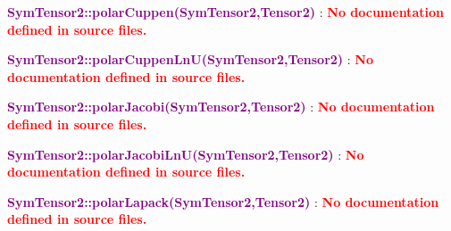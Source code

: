 
\textcolor{purple}{\textbf{SymTensor2::polarCuppen(SymTensor2,Tensor2)}}\label{SymTensor2::polarCuppen(SymTensor2,Tensor2)} : \textcolor{red}{\textbf{No documentation defined in source files.}}


\textcolor{purple}{\textbf{SymTensor2::polarCuppenLnU(SymTensor2,Tensor2)}}\label{SymTensor2::polarCuppenLnU(SymTensor2,Tensor2)} : \textcolor{red}{\textbf{No documentation defined in source files.}}


\textcolor{purple}{\textbf{SymTensor2::polarJacobi(SymTensor2,Tensor2)}}\label{SymTensor2::polarJacobi(SymTensor2,Tensor2)} : \textcolor{red}{\textbf{No documentation defined in source files.}}


\textcolor{purple}{\textbf{SymTensor2::polarJacobiLnU(SymTensor2,Tensor2)}}\label{SymTensor2::polarJacobiLnU(SymTensor2,Tensor2)} : \textcolor{red}{\textbf{No documentation defined in source files.}}


\textcolor{purple}{\textbf{SymTensor2::polarLapack(SymTensor2,Tensor2)}}\label{SymTensor2::polarLapack(SymTensor2,Tensor2)} : \textcolor{red}{\textbf{No documentation defined in source files.}}

